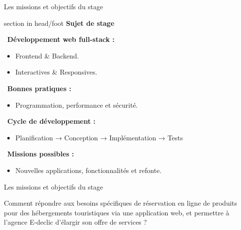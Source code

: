 \documentclass{beamer}
\begin{document}
\begin{frame}{Les missions et objectifs du stage}

	\begin{beamercolorbox}[wd=\paperwidth,ht=1.5em,dp=0.5em,leftskip=0.5cm]{section in head/foot}
  		\large \textbf{Sujet de stage}
	\end{beamercolorbox}
	\vspace{0.2em}
	
	\begin{center}
  		\begin{minipage}{1\textwidth}				

    			\faLaptopCode\ \textbf{Développement web full-stack :}
      		\begin{itemize}
        			\item Frontend \& Backend.
        			\item Interactives \& Responsives.
      		\end{itemize}

			\pause

    			\vspace{0.5em}
    			\faCheckCircle\ \textbf{Bonnes pratiques :}
      		\begin{itemize}
        			\item Programmation, performance et sécurité.
      		\end{itemize}

			\pause

    			\vspace{0.5em}
    			\faProjectDiagram\ \textbf{Cycle de développement :}
      		\begin{itemize}
        			\item Planification → Conception → Implémentation → Tests
      		\end{itemize}

			\pause

    			\vspace{0.5em}
    			\faTasks\ \textbf{Missions possibles :}
      		\begin{itemize}
        			\item Nouvelles applications, fonctionnalités et refonte.
      		\end{itemize}
  		\end{minipage}
	\end{center}
	\vfill
\end{frame}

\begin{frame}{Les missions et objectifs du stage}

	Comment répondre aux besoins spécifiques de réservation en ligne de produits pour des hébergements touristiques via une application web, et permettre à l’agence E-declic d’élargir son offre de services ?
			
	\begin{center}
  		\begin{minipage}{0.9\textwidth}
  			\vspace{10cm}
  		\end{minipage}
	\end{center}
	\vfill
\end{frame}
\end{document}
